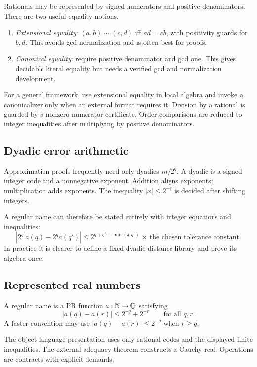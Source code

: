 Rationals may be represented by signed numerators and positive denominators.
There are two useful equality notions.

\begin{enumerate}
\item \emph{Extensional equality}: \((a,b)\sim(c,d)\) iff \(ad=cb\), with
positivity guards for \(b,d\).  This avoids gcd normalization and is often best
for proofs.
\item \emph{Canonical equality}: require positive denominator and gcd one.
This gives decidable literal equality but needs a verified gcd and
normalization development.
\end{enumerate}

For a general framework, use extensional equality in local algebra and invoke a
canonicalizer only when an external format requires it.  Division by a rational
is guarded by a nonzero numerator certificate.  Order comparisons are reduced
to integer inequalities after multiplying by positive denominators.

\subsection{Dyadic error arithmetic}

Approximation proofs frequently need only dyadics \(m/2^q\).  A dyadic is a
signed integer code and a nonnegative exponent.  Addition aligns exponents;
multiplication adds exponents.  The inequality
\(|x|\le2^{-q}\) is decided after shifting integers.

A regular name can therefore be stated entirely with integer equations and
inequalities:
\[
   |2^{q'}a(q)-2^q a(q')|\le 2^{q+q'-\min(q,q')}\,\times\,\text{the chosen tolerance constant}.
\]
In practice it is clearer to define a fixed dyadic distance library and prove
its algebra once.

\subsection{Represented real numbers}

\begin{definition}
A regular name is a PR function \(a:\mathbb N\to\mathbb Q\) satisfying
\[
       |a(q)-a(r)|\le 2^{-q}+2^{-r}
       \qquad\text{for all }q,r.
\]
A faster convention may use \(|a(q)-a(r)|\le2^{-q}\) when \(r\ge q\).
\end{definition}

The object-language presentation uses only rational codes and the displayed
finite inequalities.  The external adequacy theorem constructs a Cauchy real.
Operations are contracts with explicit demands.

